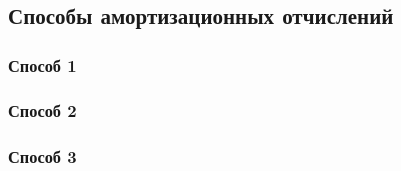 \chapter{}

\section{Способы амортизационных отчислений}

\subsection{Способ 1}

\subsection{Способ 2}

\subsection{Способ 3}
